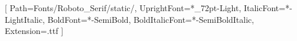 \usepackage{fontspec}

\setmainfont{RobotoSerif}[%
  Path=Fonts/Roboto_Serif/static/,
  UprightFont={*_72pt-Light},    %
  ItalicFont={*-LightItalic}, %
  BoldFont={*-SemiBold},        %
  BoldItalicFont={*-SemiBoldItalic},    %
  Extension=.ttf
]

\newfontfamily{}



